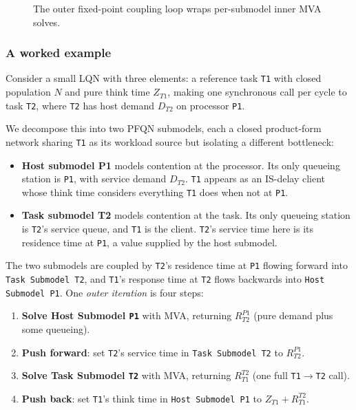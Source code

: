 \begin{figure}[h]
  \centering
  
  \caption[Outer fixed-point loop wrapping per-submodel inner MVA solves]{
    The outer fixed-point coupling loop wraps per-submodel inner MVA
    solves.
  }
  \label{fig:bg-outer-vs-inner-loop}
\end{figure}

\subsubsection*{A worked example}
Consider a small LQN with three elements: a reference task \texttt{T1} with closed population $N$ and pure think time $Z_{T1}$, making one synchronous call per cycle to task \texttt{T2}, where \texttt{T2} has host demand $D_{T2}$ on processor \texttt{P1}.

We decompose this into two PFQN submodels, each a closed product-form network sharing \texttt{T1} as its workload source but isolating a different bottleneck:

\begin{itemize}
  \item \textbf{Host submodel P1} models contention at the processor. Its only queueing station is \texttt{P1}, with service demand $D_{T2}$. \texttt{T1} appears as an IS-delay client whose think time considers everything \texttt{T1} does when not at \texttt{P1}.
  \item \textbf{Task submodel T2} models contention at the task. Its only queueing station is \texttt{T2}'s service queue, and \texttt{T1} is the client. \texttt{T2}'s service time here is its residence time at \texttt{P1}, a value supplied by the host submodel.
\end{itemize}

The two submodels are coupled by \texttt{T2}'s residence time at \texttt{P1} flowing forward into \texttt{Task Submodel T2}, and \texttt{T1}'s response time at \texttt{T2} flows backwards into \texttt{Host Submodel P1}. One \textit{outer iteration} is four steps:

\begin{enumerate}
  \item \textbf{Solve Host Submodel \texttt{P1}} with MVA, returning $R_{T2}^{P1}$ (pure demand plus some queueing).
  \item \textbf{Push forward}: set \texttt{T2}'s service time in \texttt{Task Submodel T2} to $R_{T2}^{P1}$.
  \item \textbf{Solve Task Submodel \texttt{T2}} with MVA, returning $R_{T1}^{T2}$ (one full \texttt{T1}$\to$\texttt{T2} call). 
  \item \textbf{Push back}: set \texttt{T1}'s think time in \texttt{Host Submodel P1} to $Z_{T1} + R_{T1}^{T2}$.
\end{enumerate}

